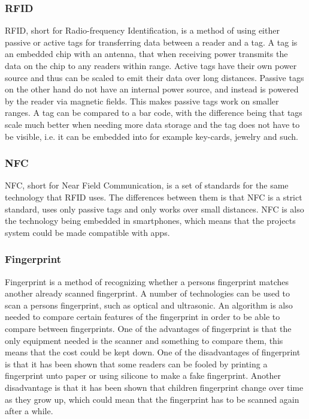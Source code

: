 \subsubsection{RFID}
RFID, short for Radio-frequency Identification, is a method of using either passive or active tags for transferring data between a reader and a tag. A tag is an embedded chip with an antenna, that when receiving power transmits the data on the chip to any readers within range. Active tags have their own power source and thus can be scaled to emit their data over long distances. Passive tags on the other hand do not have an internal power source, and instead is powered by the reader via magnetic fields. This makes passive tags work on smaller ranges. A tag can be compared to a bar code, with the difference being that tags scale much better when needing more data storage and the tag does not have to be visible, i.e. it can be embedded into for example key-cards, jewelry and such.

\subsubsection{NFC}
NFC, short for Near Field Communication, is a set of standards for the same technology that RFID uses. The differences between them is that NFC is a strict standard, uses only passive tags and only works over small distances. NFC is also the technology being embedded in smartphones, which means that the projects system could be made compatible with apps.

\subsubsection{Fingerprint}
Fingerprint is a method of recognizing whether a persons fingerprint matches another already scanned fingerprint. A number of technologies can be used to scan a persons fingerprint, such as optical and ultrasonic. An algorithm is also needed to compare certain features of the fingerprint in order to be able to compare between fingerprints. One of the advantages of fingerprint is that the only equipment needed is the scanner and something to compare them, this means that the cost could be kept down. One of the disadvantages of fingerprint is that it has been shown that some readers can be fooled by printing a fingerprint unto paper or using silicone to make a fake fingerprint. Another disadvantage is that it has been shown that children fingerprint change over time as they grow up, which could mean that the fingerprint has to be scanned again after a while.

